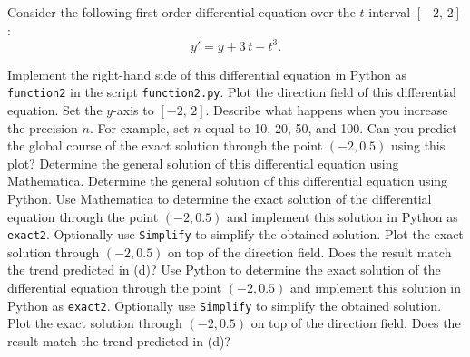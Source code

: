 \begin{Exercise} Consider the following first-order differential equation over the $t$ interval $[-2,\,2]$:
$$y'=y+3\,t-t^3.$$

\Question Implement the right-hand side of this differential equation in Python as \texttt{function2} in the script \texttt{function2.py}.
\Question Plot the direction field of this differential equation. Set the $y$-axis to $[-2,\,2]$.
\Question Describe what happens when you increase the precision $n$. For example, set $n$ equal to 10, 20, 50, and 100.
\Question Can you predict the global course of the exact solution through the point $(-2,0.5)$ using this plot?
\ifmathematica
\Question Determine the general solution of this differential equation using Mathematica.
\fi
\ifpython
\Question Determine the general solution of this differential equation using Python.
\fi
\ifmathematica
\Question Use Mathematica to determine the exact solution of the differential equation through the point $(-2,0.5)$ and implement this solution in Python as \texttt{exact2}. Optionally use \texttt{Simplify} to simplify the obtained solution. Plot the exact solution through $(-2,0.5)$ on top of the direction field. Does the result match the trend predicted in (d)?
\fi
\ifpython
\Question Use Python to determine the exact solution of the differential equation through the point $(-2,0.5)$ and implement this solution in Python as \texttt{exact2}. Optionally use \texttt{Simplify} to simplify the obtained solution. Plot the exact solution through $(-2,0.5)$ on top of the direction field. Does the result match the trend predicted in (d)?
\fi


\end{Exercise}


